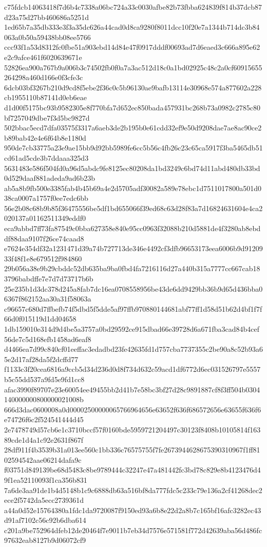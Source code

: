 {c75fdcb14063418f7d6b4c7338a06bc724a33c0030afbe82b73fbba624839f814b37dcb87d23a75d27bb460686a5251d
1ed65b7a35db333e3f3a35dc626a44cad0d8ca9280f8011dcc10f20e7a1344b714dc3b84063a0b50a59438bb08ee5766
ccc93f1a53d8312fc0fbe51a903ebd14d84e47f0917dddf00693ad7d6eaed3c666a895e62e2c9afce461f6020639671e
52826ea900a767b9a006b3c74502fb0f0a7a3ac512d18c0a1bd02925c48c2a0cf60915655264298a460d166e0f3cfe3c
6dcb03bf3267b210d9cd8f5ebe2f36c0c5b96130ae9bafb13114e30968e574a877602a228cb1955110b87141d0eb6eae
d1d00f5175bc93b9582305e8f770bfa7d652ec850bada457931bc268b73a0982c2785c80bf7257049dbe7f3d5bc9827d
502bbac5ecd7dfa03575f3317a6aeb3de2b195b0e61cdd32ef9e50d9208dae7ae8ac90ce2b89bab42e4e6f64b8e1180d
950de7cb33775a23e9ae15bb9d92bb5989fe6cc5b56c4fb26c23c65ca5917f3ba5465db51cd61ad5cde3b7ddaaa325d3
5631483e586f504fd0a96d5abdc9fe8125ec80208da1bd3249c6bd74d11abd480db33bd0d529daaf881adeda9ad6b23b
ab5a8b9fb500e3385fab4b45b69a4e2d5705adf30082a589e78ebc1d7511017800a501d038ca0007a1757f0ee7edc6bb
56e2b08c68b9b85f36475556be5df1bd655066f39ed68c63d28f83a7d16824631604e4ca2020137a01162511349eddf0
eca9abbd7ff73fa87549c0bba627358e840e95cc0963f32088b210d5881de4f3280ab8ebddf88daa9107f26ce74caad8
e7624e354df32a1231471d39a74b727713de346e4492cf3dfb96653173eea6006b9d9120933f48f1e8e679512f984860
29b056a38e9b29cbddc52db635ba9ba0fbd4fa7216116d27a440b315a7777cc667cab183796babdffe7e7d7d73717b6b
25e235b1d3dc378d245a8fab7dc16ea0708558956be43de6dd9429bb36b9d65d436bba06367f862152aa30a31f58063a
c96657c680d7ffbefb74f5dbd5f5dde5af97ffb970880144681abf77ff1d58d51b62d4bf1f7f66d0f015119d1dd04658
1db159010e314d9d4be5a3757a0bd29592ce915dbad66e39728d6a671fba3cad84b4cef56de7c5d168efb1458ad6eaf8
d4466ea7d99c840cf01eeffac3edadbd23fe42635fd1d757cba7737355c2be90a8c52b93a65e2d17af28da5f2dcffd77
f1133c3f20cea6816a9ccb5d34d236d0d8f734d632c59acd1df6772d6ec031526797e5557b5c55dd537a9fd5e9fd1cc8
afac3990f89707e23e60054ee49455bb2d41b7e58bc3bf27d28c9891887cf8f3ff504b0304140000000800000021008b
666d3dac0600008a0d00002500000065766964656e63652f636f686572656e63655f636f6e74726f6c2f524541444d45
2e7478749d57cb6e1c3710bccf57f0160bde5959721204497c30123f8408b10105814f16389cde1d4a1c92e2631f867f
28df911f4b3539b31a013ee560c1bb336c76575755f7fe2673944628675390310967f1ff8102594542aae06214dafa9c
f03751d849139be68d5483c8be9789444c32247e47a481442fc3bd78c829e8b4123476d49f1ea52110093f1ca356b831
7a6de3aa91de1b4d5148b1c9c6888db63a516bf8da777fdc5c233c79e136a2cf41268dec2ece2f5742da5ecc2739361d
a44a0d52e15764380a1fdc1da9720087f9150ed93a6b8e22d2a8b7c165bf16afc3282ec43d91af7102c56c92b6dba614
c201a9be752964dfeb12de20464f7e9011b7eb34d7576e571581f772d42639aba56d486fc97632eab8127b9d06072cf9
}
